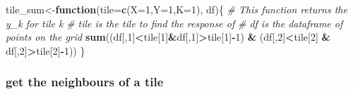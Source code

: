 \documentclass[
]{article}
\newenvironment{Shaded}{\begin{snugshade}}{\end{snugshade}}
\newcommand{\AttributeTok}[1]{\textcolor[rgb]{0.13,0.29,0.53}{#1}}
\newcommand{\CommentTok}[1]{\textcolor[rgb]{0.56,0.35,0.01}{\textit{#1}}}
\newcommand{\ControlFlowTok}[1]{\textcolor[rgb]{0.13,0.29,0.53}{\textbf{#1}}}
\newcommand{\DecValTok}[1]{\textcolor[rgb]{0.00,0.00,0.81}{#1}}
\newcommand{\FunctionTok}[1]{\textcolor[rgb]{0.13,0.29,0.53}{\textbf{#1}}}
\newcommand{\NormalTok}[1]{#1}
\newcommand{\OtherTok}[1]{\textcolor[rgb]{0.56,0.35,0.01}{#1}}
\newcommand{\SpecialCharTok}[1]{\textcolor[rgb]{0.81,0.36,0.00}{\textbf{#1}}}
\begin{document}
\begin{Shaded}
\begin{Highlighting}[]
\NormalTok{tile\_sum}\OtherTok{\textless{}{-}}\ControlFlowTok{function}\NormalTok{(}\AttributeTok{tile=}\FunctionTok{c}\NormalTok{(}\AttributeTok{X=}\DecValTok{1}\NormalTok{,}\AttributeTok{Y=}\DecValTok{1}\NormalTok{,}\AttributeTok{K=}\DecValTok{1}\NormalTok{), df)\{}
  \CommentTok{\# This function returns the y\_k for tile k}
  \CommentTok{\# tile is the tile to find the response of }
  \CommentTok{\# df is the dataframe of points on the grid}
  \FunctionTok{sum}\NormalTok{((df[,}\DecValTok{1}\NormalTok{]}\SpecialCharTok{\textless{}}\NormalTok{tile[}\DecValTok{1}\NormalTok{]}\SpecialCharTok{\&}\NormalTok{df[,}\DecValTok{1}\NormalTok{]}\SpecialCharTok{\textgreater{}}\NormalTok{tile[}\DecValTok{1}\NormalTok{]}\SpecialCharTok{{-}}\DecValTok{1}\NormalTok{) }\SpecialCharTok{\&}\NormalTok{ (df[,}\DecValTok{2}\NormalTok{]}\SpecialCharTok{\textless{}}\NormalTok{tile[}\DecValTok{2}\NormalTok{] }\SpecialCharTok{\&}\NormalTok{ df[,}\DecValTok{2}\NormalTok{]}\SpecialCharTok{\textgreater{}}\NormalTok{tile[}\DecValTok{2}\NormalTok{]}\SpecialCharTok{{-}}\DecValTok{1}\NormalTok{))}
\NormalTok{\}}
\end{Highlighting}
\end{Shaded}

\subsubsection{get the neighbours of a
tile}\label{get-the-neighbours-of-a-tile}
\end{document}
